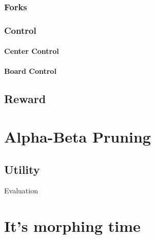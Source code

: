 \documentclass[a4paper,openany]{uantwerpenassignment}
\begin{document}
\subsection{Forks}
\subsection{Control}
\subsubsection{Center Control}
\subsubsection{Board Control}

\section{Reward}

\chapter{Alpha-Beta Pruning}

\section{Utility}

Evaluation\cite{chessprogramming}

\chapter{It's morphing time}



\end{document}

